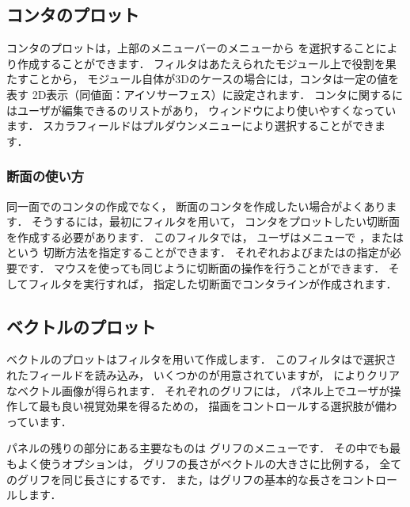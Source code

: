 \subsection{コンタのプロット}
\label{ssec:6.1.6}
コンタのプロットは，上部のメニューバーのメニューから
を選択することにより作成することができます．
フィルタはあたえられたモジュール上で役割を果たすことから，
モジュール自体が3Dのケースの場合には，コンタは一定の値を表す
2D表示（同値面：アイソサーフェス）に設定されます．
コンタに関するにはユーザが編集できるのリストがあり，
ウィンドウにより使いやすくなっています．
スカラフィールドはプルダウンメニューにより選択することができます．

\subsubsection{断面の使い方}
\label{sssec:6.1.6.1}
同一面でのコンタの作成でなく，
断面のコンタを作成したい場合がよくあります．
そうするには，最初にフィルタを用いて，
コンタをプロットしたい切断面を作成する必要があります．
このフィルタでは，
ユーザはメニューで
，またはという
切断方法を指定することができます．
%
それぞれおよびまたはの指定が必要です．
マウスを使っても同じように切断面の操作を行うことができます．
そしてフィルタを実行すれば，
指定した切断面でコンタラインが作成されます．

\subsection{ベクトルのプロット}
\label{ssec:6.1.7}
ベクトルのプロットはフィルタを用いて作成します．
このフィルタはで選択されたフィールドを読み込み，
いくつかのが用意されていますが，
によりクリアなベクトル画像が得られます．
それぞれのグリフには，
パネル上でユーザが操作して最も良い視覚効果を得るための，
描画をコントロールする選択肢が備わっています．

パネルの残りの部分にある主要なものは
グリフのメニューです．
その中でも最もよく使うオプションは，
グリフの長さがベクトルの大きさに比例する，
全てのグリフを同じ長さにするです．
また，はグリフの基本的な長さをコントロールします．


